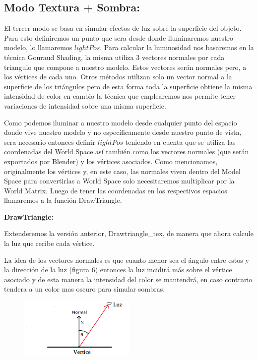 \documentclass[a4paper]{article}
\newcounter{col}
\begin{document}
\subsection{Modo Textura + Sombra:} 

	El tercer modo se basa en simular efectos de luz sobre la superficie del objeto. Para esto definiremos un punto que sera desde donde iluminaremos nuestro modelo, lo llamaremos $lightPos$. Para calcular la luminosidad nos basaremos en la técnica Gouraud Shading, la misma utiliza 3 vectores normales por cada triangulo que compone a nuestro modelo. Estos vectores serán normales pero, a los vértices de cada uno. Otros métodos utilizan solo un vector normal a la superficie de los triángulos pero de esta forma toda la superficie obtiene la misma intensidad de color en cambio la técnica que emplearemos nos permite tener variaciones de intensidad sobre una misma superficie. 
\par Como podemos iluminar a nuestro modelo desde cualquier punto del espacio donde vive nuestro modelo y no específicamente desde nuestro punto de vista, sera necesario entonces definir $lightPos$ teniendo en cuenta que se utiliza las coordenadas del World Space así también como los vectores normales (que serán exportados por Blender) y los vértices asociados. Como mencionamos, originalmente los vértices y, en este caso, las normales viven dentro del Model Space para convertirlas a World Space solo necesitaremos multiplicar por la World Matrix.   Luego de tener las coordenadas en los respectivos espacios llamaremos a la función DrawTriangle.




\textbf{DrawTriangle:} 

 	Extenderemos la versión anterior, Drawtriangle_tex, de manera que ahora calcule la luz que recibe cada vértice.
\par La idea de los vectores normales es que cuanto menor sea el ángulo entre estos y la dirección de la luz (figura 6) entonces la luz incidirá más sobre el vértice asociado y de esta manera la intensidad del color se mantendrá, en caso contrario tendera a un color mas oscuro para simular sombras. 
	
	
	\begin{figure}[h]
    \centering
    \includegraphics[width=0.50\textwidth]{Imagenes/f.png}
    \caption{}
    \label{fig:mesh1}
\end{figure}
\end{document}
